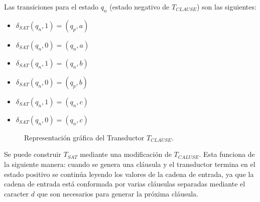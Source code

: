 Las transiciones para el estado $q_n$ (estado negativo de $T_{CLAUSE}$) son las siguientes:
\begin{multicols}{2}
    \begin{itemize}
        \item $\delta_{SAT}(q_{n},1)=(q_{p},a)$
        \item $\delta_{SAT}(q_{n},0)=(q_{n},a)$
        \item $\delta_{SAT}(q_{n},1)=(q_{n},b)$
        \item $\delta_{SAT}(q_{n},0)=(q_{p},b)$
        \item $\delta_{SAT}(q_{n},1)=(q_{n},c)$
        \item $\delta_{SAT}(q_{n},0)=(q_{n},c)$
    \end{itemize}
\end{multicols}

\begin{figure}[h]
    \centering  \begin{otherlanguage}{english}
    \end{otherlanguage}
    \caption{Representación gráfica del Transductor $T_{CLAUSE}$.}
    \label{fig:transducer_clause} %
\end{figure}

Se puede construir $T_{SAT}$ mediante una modificación de $T_{CALUSE}$. Esta  funciona de la siguiente manera: cuando se genera una cláusula y el transductor termina en el estado positivo se continúa leyendo los valores de la cadena de entrada, ya que la cadena de entrada está conformada por varias cláusulas separadas mediante el caracter $d$ que son necesarios para generar la próxima cláusula.

